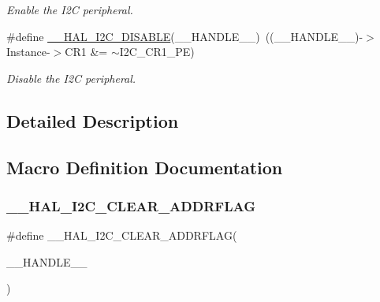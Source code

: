 \begin{DoxyCompactItemize}
\begin{DoxyCompactList}\small\item\em Enable the I2C peripheral. \end{DoxyCompactList}\item 
\#define \hyperlink{group___i2_c___exported___macros_ga3d6a35da02ca72537a15570912c80412}{\+\_\+\+\_\+\+H\+A\+L\+\_\+\+I2\+C\+\_\+\+D\+I\+S\+A\+B\+LE}(\+\_\+\+\_\+\+H\+A\+N\+D\+L\+E\+\_\+\+\_\+)~((\+\_\+\+\_\+\+H\+A\+N\+D\+L\+E\+\_\+\+\_\+)-\/$>$Instance-\/$>$C\+R1 \&=  $\sim$I2\+C\+\_\+\+C\+R1\+\_\+\+PE)
\begin{DoxyCompactList}\small\item\em Disable the I2C peripheral. \end{DoxyCompactList}\end{DoxyCompactItemize}


\subsection{Detailed Description}


\subsection{Macro Definition Documentation}
\mbox{\label{group___i2_c___exported___macros_ga15a0a1a04971d44f9a1b82cab10af24f}} 
\subsubsection{\texorpdfstring{\+\_\+\+\_\+\+H\+A\+L\+\_\+\+I2\+C\+\_\+\+C\+L\+E\+A\+R\+\_\+\+A\+D\+D\+R\+F\+L\+AG}{\_\_HAL\_I2C\_CLEAR\_ADDRFLAG}}
{\footnotesize\ttfamily \#define \+\_\+\+\_\+\+H\+A\+L\+\_\+\+I2\+C\+\_\+\+C\+L\+E\+A\+R\+\_\+\+A\+D\+D\+R\+F\+L\+AG(\begin{DoxyParamCaption}\item[{}]{\+\_\+\+\_\+\+H\+A\+N\+D\+L\+E\+\_\+\+\_\+ }\end{DoxyParamCaption})}

